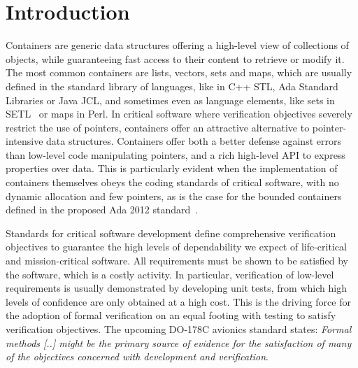 \documentclass[runningheads,a4paper]{llncs}
\newcommand{\aftersec}{\vspace{-0.2cm}}
\begin{document}
\vspace{-0.5cm}
\section{Introduction}
\aftersec

Containers
are generic data structures offering a high-level
view of collections of objects, while guaranteeing fast access to their content
to retrieve or modify it. The most common containers are lists, vectors, sets
and maps, which are usually defined in the standard library of languages, like
in C++ STL, Ada Standard Libraries or Java JCL, and sometimes even as language
elements, like sets in SETL~\cite{schwartz:1986} or maps in Perl.
In critical software where
verification objectives severely restrict the use of pointers, containers offer
an attractive alternative to pointer-intensive data structures. 
Containers offer both a better defense against errors than low-level code 
manipulating pointers, and a rich high-level API to express properties over 
data. 
This is
particularly evident when the implementation of containers themselves obeys the
coding standards of critical software, with no dynamic allocation and few
pointers, as is the case for the bounded containers defined in the proposed Ada
2012 standard~\cite{ada2012}.

Standards for critical software development define comprehensive verification
objectives to guarantee the high levels of dependability we expect of
life-critical and mission-critical software. All requirements must be shown to
be satisfied by the software, which is a costly activity. In particular,
verification of low-level requirements is usually demonstrated by developing
unit tests, from which high levels of confidence are only obtained at a high
cost. This is the driving force for the adoption of formal verification on an
equal footing with testing to satisfy verification objectives. The upcoming
DO-178C avionics standard states: \textit{Formal methods [..] might
  be the primary source of evidence for the satisfaction of many of the
  objectives concerned with development and verification}.
\end{document}
